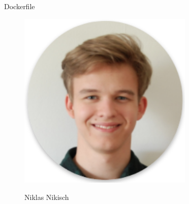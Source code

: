 \documentclass[final]{beamer}
\newlength{\sepwid}
\newlength{\onecolwid}
\begin{document}
\begin{frame}
\begin{columns}[t]
\begin{column}{\onecolwid}
\begin{block}{Dockerfile}
\begin{figure}
\begin{minipage}[t]{0.40\textwidth}
\includegraphics[width=1.0\textwidth]{niklasnikisch} 
\begin{center}
	Niklas Nikisch
\end{center}
\end{minipage}\hfill%

\end{figure}


\end{block}


\end{column} %

\begin{column}{\sepwid}\end{column} %

\end{columns} %
\end{frame} %
\end{document}
